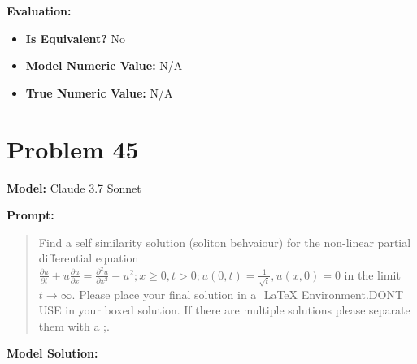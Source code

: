 \documentclass{article}
\begin{document}
\textbf{Evaluation:}
\begin{itemize}
\item \textbf{Is Equivalent?} No
\item \textbf{Model Numeric Value:} N/A
\item \textbf{True Numeric Value:} N/A
\end{itemize}
\vspace{1cm}
\section*{Problem 45}
\textbf{Model:} Claude 3.7 Sonnet

\textbf{Prompt:}
\begin{quote}
Find a self similarity solution (soliton behvaiour) for the non-linear partial differential equation $\frac{\partial u}{\partial t} + u \frac{\partial u}{\partial x} = \frac{\partial^2 u}{\partial x^2} - u^2; x \geq 0, t > 0; u(0, t) = \frac{1}{\sqrt{t}}, u(x,0) = 0$ in the limit $t \rightarrow \infty$. Please place your final solution in a $\boxed{}$ LaTeX Environment.DONT USE \operatorname in your boxed solution. If there are multiple solutions please separate them with a ;.
\end{quote}
\textbf{Model Solution:}
\end{document}
